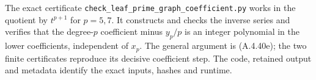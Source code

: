 The exact certificate
\texttt{check\_leaf\_prime\_graph\_coefficient.py}
works in the quotient by $t^{p+1}$ for $p=5,7$.  It constructs and
checks the inverse series and verifies that the degree-$p$
coefficient minus $y_p/p$ is an integer polynomial in the lower
coefficients, independent of $x_p$.  The general argument is
(A.4.40e); the two finite certificates reproduce its decisive
coefficient step.  The code, retained output and metadata identify
the exact inputs, hashes and runtime.
